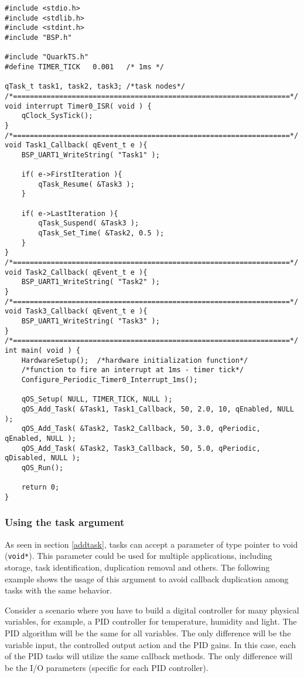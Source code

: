 \begin{lstlisting}[style=CStyle]
#include <stdio.h>
#include <stdlib.h>
#include <stdint.h>
#include "BSP.h"

#include "QuarkTS.h"
#define TIMER_TICK   0.001   /* 1ms */ 

qTask_t task1, task2, task3; /*task nodes*/
/*==================================================================*/
void interrupt Timer0_ISR( void ) {
    qClock_SysTick();   
}
/*==================================================================*/
void Task1_Callback( qEvent_t e ){
    BSP_UART1_WriteString( "Task1" );

    if( e->FirstIteration ){
        qTask_Resume( &Task3 );    
    }
    
    if( e->LastIteration ){
        qTask_Suspend( &Task3 );
        qTask_Set_Time( &Task2, 0.5 );
    }
}
/*==================================================================*/
void Task2_Callback( qEvent_t e ){
    BSP_UART1_WriteString( "Task2" );
}
/*==================================================================*/
void Task3_Callback( qEvent_t e ){
    BSP_UART1_WriteString( "Task3" );
}
/*==================================================================*/
int main( void ) {    
    HardwareSetup();  /*hardware initialization function*/
    /*function to fire an interrupt at 1ms - timer tick*/
    Configure_Periodic_Timer0_Interrupt_1ms(); 
    
    qOS_Setup( NULL, TIMER_TICK, NULL );     
    qOS_Add_Task( &Task1, Task1_Callback, 50, 2.0, 10, qEnabled, NULL );
    qOS_Add_Task( &Task2, Task2_Callback, 50, 3.0, qPeriodic, qEnabled, NULL );
    qOS_Add_Task( &Task2, Task3_Callback, 50, 5.0, qPeriodic, qDisabled, NULL );
    qOS_Run();
	
    return 0;
}
\end{lstlisting}

\subsubsection{Using the task argument}
As seen in section \ref{addtask}, tasks can accept a parameter of type pointer to void (\lstinline{void*}). 
This parameter could be used for multiple applications, including storage, task identification, duplication removal and others. The following example shows the usage of this argument to avoid callback duplication among tasks with the same behavior. 

Consider a scenario where you have to build a digital controller for many physical variables, for example, a PID controller for temperature, humidity and light. The PID algorithm will be the same for all variables. The only difference will be the variable input, the controlled output action and the PID gains. In this case, each of the PID tasks will utilize the same callback methods. The only difference will be the I/O parameters (specific for each PID controller). \\

